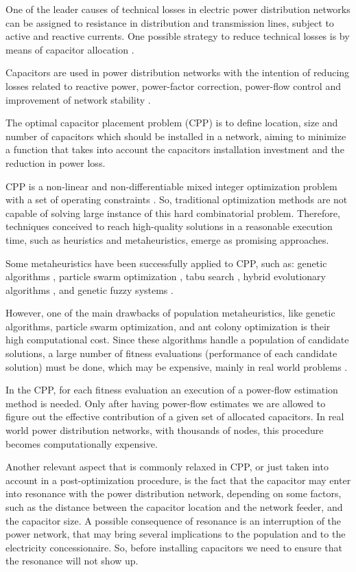 \documentclass[11pt]{article}
\begin{document}
One of the leader causes of technical losses in electric power distribution networks
can be assigned to resistance in distribution and transmission lines, 
subject to active and reactive currents. One possible strategy to reduce 
technical losses is by means of capacitor allocation \citep{Bunch1982}.

Capacitors are used in power distribution networks
with the intention of reducing losses related to reactive power,
power-factor correction, power-flow control and improvement  
of network stability \citep{Madeiro2011}.

The optimal capacitor placement problem (CPP) is to define 
location, size and number of capacitors which should be installed 
in a network, aiming to minimize a function that takes into account
the capacitors installation investment and the reduction in
power loss.

CPP is a non-linear and non-differentiable mixed integer optimization problem with
a set of operating constraints \citep{Yu2004}.
So, traditional optimization methods are not capable of solving large instance
of this hard combinatorial problem. Therefore, techniques conceived to reach
high-quality solutions in a reasonable execution time, such as heuristics
and metaheuristics, emerge as promising approaches.

Some metaheuristics have been successfully applied to CPP, such as:
genetic algorithms \citep{Delfanti2000,Mendes2005}, particle swarm optimization
\citep{Yu2004}, tabu search \citep{Huang1996}, hybrid evolutionary algorithms \citep{Mendes2005}, and genetic fuzzy systems \citep{Das2008}.

However, one of the main drawbacks of population metaheuristics, like genetic algorithms, particle swarm optimization, and ant colony optimization is their high computational cost. Since these 
algorithms handle a population of candidate solutions, a large number of fitness evaluations 
(performance of each candidate solution) must be done, which may be expensive, mainly in real world 
problems \citep{Jin2005}. 

In the CPP, for each fitness evaluation an execution of a power-flow estimation method
is needed. Only after having power-flow estimates we are allowed to figure out the effective
contribution of a given set of allocated capacitors. In real world power distribution 
networks, with thousands of nodes, this procedure becomes computationally expensive.

Another relevant aspect that is commonly relaxed in CPP, or just taken into account in
a post-optimization procedure, is the fact that the capacitor may enter into 
resonance with the power distribution network, depending on some factors, such as the distance
between the capacitor location and the network feeder, and the capacitor size. 
A possible consequence of resonance is an interruption of the power network, that may 
bring several implications to the population and to the electricity concessionaire. So, 
before installing capacitors we need to ensure that the resonance will not show up.
\end{document}
